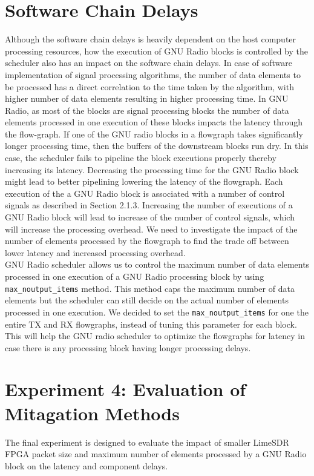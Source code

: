 \section{Software Chain Delays}

Although the software chain delays is heavily dependent on the host computer processing resources, how the execution of GNU Radio blocks is controlled by the scheduler also has an impact on the software chain delays.
In case of software implementation of signal processing algorithms, the number of data elements to be processed has a direct correlation to the time taken by the algorithm, with higher number of data elements resulting in higher processing time.
In GNU Radio, as most of the blocks are signal processing blocks the number of data elements processed in one execution of these blocks impacts the latency through the flow-graph.
If one of the GNU radio blocks in a flowgraph takes significantly longer processing time, then the buffers of the downstream blocks run dry.
In this case, the scheduler fails to pipeline the block executions properly thereby increasing its latency.
Decreasing the processing time for the GNU Radio block might lead to better pipelining lowering the latency of the flowgraph.
Each execution of the a GNU Radio block is associated with a number of control signals as described in Section 2.1.3.
Increasing the number of executions of a GNU Radio block will lead to increase of the number of control signals, which will increase the processing overhead.
We need to investigate the impact of the number of elements processed by the flowgraph to find the trade off between lower latency and increased processing overhead.\\


GNU Radio scheduler allows us to control the maximum number of data elements processed in one execution of a GNU Radio processing block by using \texttt{max\_noutput\_items} method.
This method caps the maximum number of data elements but the scheduler can still decide on the actual number of elements processed in one execution.
We decided to set the \texttt{max\_noutput\_items} for one the entire TX and RX flowgraphs, instead of tuning this parameter for each block.
This will help the GNU radio scheduler to optimize the flowgraphs for latency in case there is any processing block having longer processing delays.


\section{Experiment 4: Evaluation of Mitagation Methods} \label{exp4}
The final experiment is designed to evaluate the impact of smaller LimeSDR FPGA packet size and maximum number of elements processed by a GNU Radio block on the latency and component delays.

